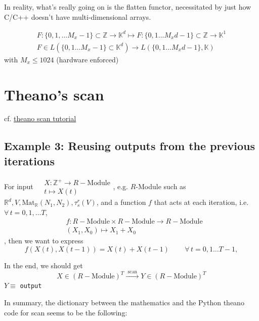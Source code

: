 \documentclass[10pt]{amsart}
\begin{document}
\begin{multicols*}{2}
In reality, what's really going on is the flatten functor, necessitated by just how C/C++ doesn't have multi-dimensional arrays.

\begin{equation}
\begin{gathered}
  F:\lbrace 0 ,1,\dots M_x - 1 \rbrace \subset \mathbb{Z} \to \mathbb{K}^d \mapsto F:\lbrace 0,1\dots M_xd-1\rbrace \subset \mathbb{Z} \to \mathbb{K}^1 \\
  F \in L(\lbrace0,1\dots M_x-1\rbrace \subset \mathbb{K}^d) \to L(\lbrace 0,1\dots M_xd-1\rbrace, \mathbb{K} )
  \end{gathered}
  \end{equation}
with $M_x\leq 1024$ (hardware enforced)

\section{Theano's scan}

cf. \href{https://nbviewer.jupyter.org/github/lamblin/ccw_tutorial/blob/master/Scan_W2016/scan_tutorial.ipynb}{theano scan tutorial}

\subsection{Example 3: Reusing outputs from the previous iterations}  

For input $\begin{aligned} & X:\mathbb{Z}^+ \to R-\text{Module}  \\
  & t\mapsto X(t) \end{aligned} $, e.g. $R$-Module such as $\mathbb{R}^d, V, \text{Mat}_{\mathbb{R}}(N_1,N_2), \tau_s^r(V)$, and a function $f$ that acts at each iteration, i.e. $\forall \, t=0,1,\dots T$, 
\[
\begin{aligned}
  & f: R-\text{Module} \times R-\text{Module} \to R-\text{Module} \\ 
  & (X_1,X_0) \mapsto X_1 + X_0 
  \end{aligned}
\], then we want to express
\[
f(X(t),X(t-1)) = X(t)+X(t-1) \qquad \, \forall \, t=0,1\dots T-1,
\]

In the end, we should get 
\[
X\in (R-\text{Module})^T \xrightarrow{ \text{ scan } } Y \in (R-\text{Module})^T
\]
$Y \equiv $ \verb|output|

In summary, the dictionary between the mathematics and the Python theano code for scan seems to be the following:


\end{multicols*}
\end{document}
